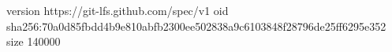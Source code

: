 version https://git-lfs.github.com/spec/v1
oid sha256:70a0d85fbdd4b9e810abfb2300ee502838a9c6103848f28796de25ff6295e352
size 140000
